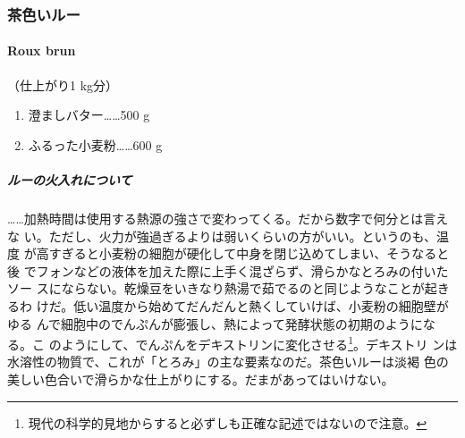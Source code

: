 \maeaki
\begin{recette}
\hypertarget{rouxbrun}{%
\subsubsection{茶色いルー}\label{rouxbrun}}

\hypertarget{roux-brun}{%
\paragraph{Roux brun}\label{roux-brun}}

 

（仕上がり1 kg分）

\begin{enumerate}
\def\labelenumi{\arabic{enumi}.}
\tightlist
\item
  澄ましバター\ldots{}\ldots{}500 g
\item
  ふるった小麦粉\ldots{}\ldots{}600 g
\end{enumerate}

\maeaki

\hypertarget{cuisson-des-roux}{%
\subparagraph{ルーの火入れについて}\label{cuisson-des-roux}}


\ldots{}\ldots{}加熱時間は使用する熱源の強さで変わってくる。だから数字で何分とは言えな
い。ただし、火力が強過ぎるよりは弱いくらいの方がいい。というのも、温度
が高すぎると小麦粉の細胞が硬化して中身を閉じ込めてしまい、そうなると後
でフォンなどの液体を加えた際に上手く混ざらず、滑らかなとろみの付いたソー
スにならない。乾燥豆をいきなり熱湯で茹でるのと同じようなことが起きるわ
けだ。低い温度から始めてだんだんと熱くしていけば、小麦粉の細胞壁がゆる
んで細胞中のでんぷんが膨張し、熱によって発酵状態の初期のようになる。こ
のようにして、でんぷんをデキストリンに変化させる\footnote{現代の科学的見地からすると必ずしも正確な記述ではないので注意。}。デキストリ
ンは水溶性の物質で、これが「とろみ」の主な要素なのだ。茶色いルーは淡褐
色の美しい色合いで滑らかな仕上がりにする。だまがあってはいけない。


\end{recette}
